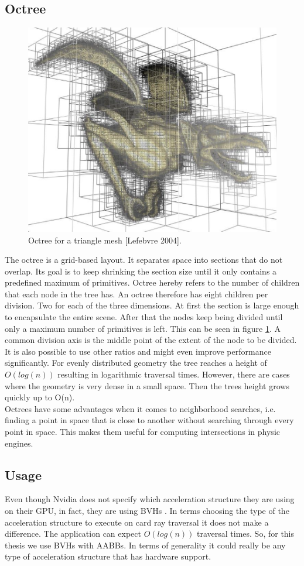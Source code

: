 \subsection{Octree}
\label{sec:Octree}
\begin{figure}
    \centering
    \includegraphics[width=.5\textwidth]{images/showcase/Octree Lefebvre 2004.PNG}
    \caption{Octree for a triangle mesh [Lefebvre 2004].}
    \label{fig:Octree}
\end{figure}
The octree is a grid-based layout. It separates space into sections that do not overlap. Its goal is to keep shrinking the section size until it only contains a predefined maximum of primitives. Octree hereby refers to the number of children that each node in the tree has. An octree therefore has eight children per division. Two for each of the three dimensions. At first the section is large enough to encapsulate the entire scene. After that the nodes keep being divided until only a maximum number of primitives is left. This can be seen in figure \ref{fig:Octree}. A common division axis is the middle point of the extent of the node to be divided. It is also possible to use other ratios and might even improve performance significantly. For evenly distributed geometry the tree reaches a height of $O(log(n))$ resulting in logarithmic traversal times. However, there are cases where the geometry is very dense in a small space. Then the trees height grows quickly up to O(n).\\
Octrees have some advantages when it comes to neighborhood searches, i.e. finding a point in space that is close to another without searching through every point in space. This makes them useful for computing intersections in physic engines.
\subsection{Usage}
Even though Nvidia does not specify which acceleration structure they are using on their GPU, in fact, they are using BVHs \cite{nvidiaTuringArchitecture}. In terms choosing the type of the acceleration structure to execute on card ray traversal it does not make a difference. The application can expect $O(log(n))$ traversal times. So, for this thesis we use BVHs with AABBs. In terms of generality it could really be any type of acceleration structure that has hardware support.
\newpage
